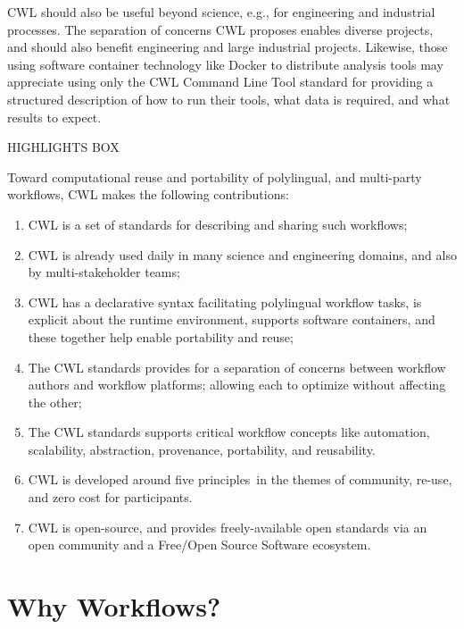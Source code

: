 \documentclass[sigconf,authordraft]{acmart}
\begin{document}
CWL should also be useful beyond science, e.g., for engineering
and industrial processes. The separation of concerns CWL proposes
enables diverse projects, and should also benefit engineering and large
industrial projects. Likewise, those using software container technology
like Docker to distribute analysis tools may appreciate using only the
CWL Command Line Tool standard for providing a structured description of
how to run their tools, what data is required, and what results to
expect.

HIGHLIGHTS BOX

Toward computational reuse and portability of polylingual, and
multi-party workflows, CWL makes the following contributions:

\begin{enumerate}
\item
  {CWL is a set of standards for describing and sharing such workflows;}
\item
  {CWL is already used daily in many science and engineering domains,
  and also by multi-stakeholder teams;}
\item
  {CWL has a declarative syntax facilitating polylingual workflow tasks,
  is explicit about the runtime environment, supports software
  containers, and these together help enable portability and reuse;}
\item
  {The CWL standards provides for a separation of concerns between
  workflow authors and workflow platforms; allowing each to optimize
  without affecting the other;}
\item
  {The CWL standards supports critical workflow concepts like
  automation, scalability, abstraction, provenance, portability, and
  reusability.}
\item
  {CWL is developed around }{five principles}{~in the themes of
  community, re-use, and zero cost for participants.}
\item
  {CWL is open-source, and provides freely-available open standards via
  an open community and a Free/Open Source Software ecosystem.}
\end{enumerate}

\section{Why Workflows?}
\end{document}
